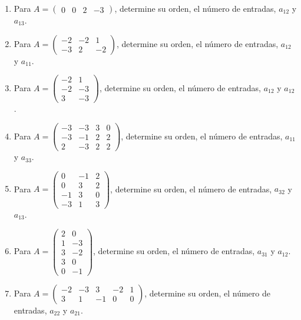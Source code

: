 \documentclass[12pt]{article}
\theoremstyle{remark}
\newcounter{contadorEjercicio}
\newenvironment{listaejercicios}{\begin{enumerate}[label=\textbf{E\arabic*.},leftmargin=2.4em,itemsep=0.52em]\setcounter{enumi}{\value{contadorEjercicio}}}{\setcounter{contadorEjercicio}{\value{enumi}}\end{enumerate}}
\begin{document}
\begin{listaejercicios}

\item Para $A=\begin{pmatrix}0&0&2&-3\end{pmatrix}$, determine su orden, el número de entradas, $a_{12}$ y $a_{13}$.

\item Para $A=\begin{pmatrix}-2&-2&1\\-3&2&-2\end{pmatrix}$, determine su orden, el número de entradas, $a_{12}$ y $a_{11}$.

\item Para $A=\begin{pmatrix}-2&1\\-2&-3\\3&-3\end{pmatrix}$, determine su orden, el número de entradas, $a_{12}$ y $a_{12}$.

\item Para $A=\begin{pmatrix}-3&-3&3&0\\-3&-1&2&2\\2&-3&2&2\end{pmatrix}$, determine su orden, el número de entradas, $a_{11}$ y $a_{33}$.

\item Para $A=\begin{pmatrix}0&-1&2\\0&3&2\\-1&3&0\\-3&1&3\end{pmatrix}$, determine su orden, el número de entradas, $a_{32}$ y $a_{13}$.

\item Para $A=\begin{pmatrix}2&0\\1&-3\\3&-2\\3&0\\0&-1\end{pmatrix}$, determine su orden, el número de entradas, $a_{31}$ y $a_{12}$.

\item Para $A=\begin{pmatrix}-2&-3&3&-2&1\\3&1&-1&0&0\end{pmatrix}$, determine su orden, el número de entradas, $a_{22}$ y $a_{21}$.


\end{listaejercicios}
\end{document}
